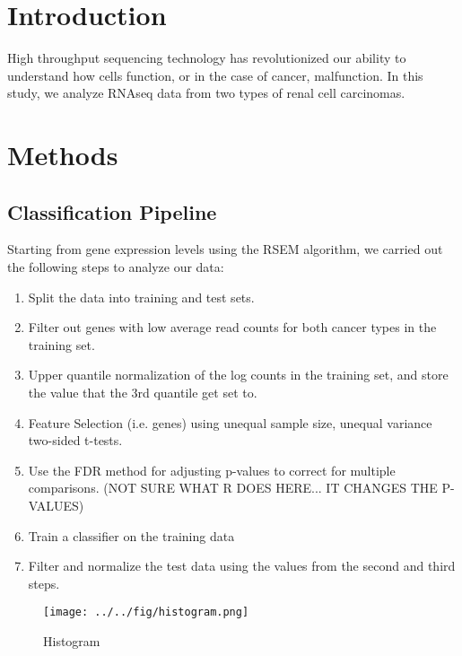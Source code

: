 \section{Introduction}

High throughput sequencing technology has revolutionized our ability to
understand how cells function, or in the case of cancer, malfunction. In this
study, we analyze RNAseq data from two types of renal cell carcinomas. 


\section{Methods}
\subsection{Classification Pipeline}

Starting from gene expression levels using the RSEM algorithm, we carried out
the following steps to analyze our data:

\begin{enumerate}
\item Split the data into training and test sets. 
\item Filter out genes with low average read counts for both cancer types in the training set. 
\item Upper quantile normalization of the log counts in the training set, and store the value that the 3rd quantile get set to. 
\item Feature Selection (i.e. genes) using unequal sample size, unequal variance two-sided t-tests. 
\item Use the FDR method for adjusting p-values to correct for multiple comparisons. (NOT SURE WHAT R DOES HERE... IT CHANGES THE P-VALUES)
\item Train a classifier on the training data
\item Filter and normalize the test data using the values from the second and third steps. 
\end{enumerate}

\begin{figure}[H]
  \centering
    \texttt{[image: ../../fig/histogram.png]}
\caption{Histogram }
   \label{fig:histogram}
\end{figure}


